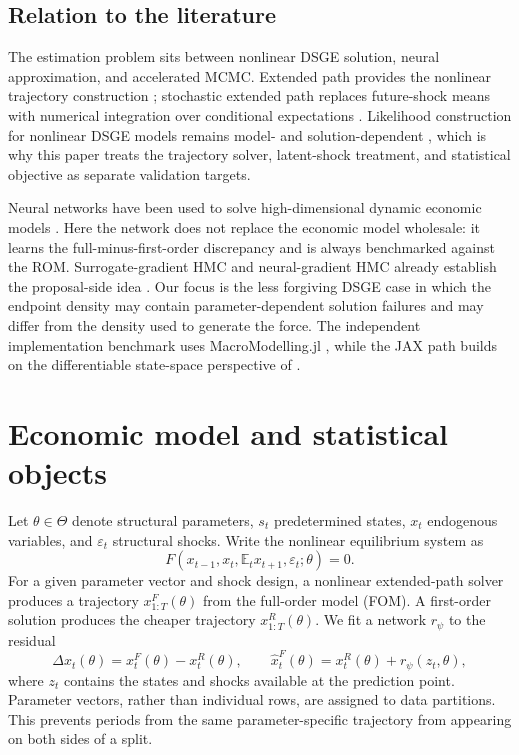 \documentclass[11pt]{article}
\newcommand{\E}{\mathbb{E}}
\begin{document}
\subsection{Relation to the literature}

The estimation problem sits between nonlinear DSGE solution, neural
approximation, and accelerated MCMC. Extended path provides the nonlinear
trajectory construction \citep{fair1983extended}; stochastic extended path
replaces future-shock means with numerical integration over conditional
expectations \citep{adjemian2025sep}. Likelihood construction for nonlinear
DSGE models remains model- and solution-dependent \citep{kollmann2017tractable},
which is why this paper treats the trajectory solver, latent-shock treatment,
and statistical objective as separate validation targets.

Neural networks have been used to solve high-dimensional dynamic economic
models \citep{maliar2021deep}. Here the network does not replace the economic
model wholesale: it learns the full-minus-first-order discrepancy and is always
benchmarked against the ROM. Surrogate-gradient HMC and neural-gradient HMC
already establish the proposal-side idea \citep{zhang2017surrogate,li2019nnghmc}.
Our focus is the less forgiving DSGE case in which the endpoint density may
contain parameter-dependent solution failures and may differ from the density
used to generate the force. The independent implementation benchmark uses
MacroModelling.jl \citep{kockerols2023macromodelling}, while the JAX path builds
on the differentiable state-space perspective of
\citet{childers2022differentiable}.

\section{Economic model and statistical objects}

Let $\theta\in\Theta$ denote structural parameters, $s_t$ predetermined states,
$x_t$ endogenous variables, and $\varepsilon_t$ structural shocks. Write the
nonlinear equilibrium system as
\begin{equation}
  F(x_{t-1},x_t,\E_t x_{t+1},\varepsilon_t;\theta)=0.
  \label{eq:equilibrium}
\end{equation}
For a given parameter vector and shock design, a nonlinear extended-path solver
produces a trajectory $x^{F}_{1:T}(\theta)$ from the full-order model (FOM). A
first-order solution produces the cheaper trajectory $x^{R}_{1:T}(\theta)$. We
fit a network $r_{\psi}$ to the residual
\begin{equation}
  \Delta x_t(\theta)=x^{F}_t(\theta)-x^{R}_t(\theta),
  \qquad
  \widehat{x}^{F}_t(\theta)=x^{R}_t(\theta)+r_{\psi}(z_t,\theta),
  \label{eq:residual-surrogate}
\end{equation}
where $z_t$ contains the states and shocks available at the prediction point.
Parameter vectors, rather than individual rows, are assigned to data
partitions. This prevents periods from the same parameter-specific trajectory
from appearing on both sides of a split.
\end{document}
